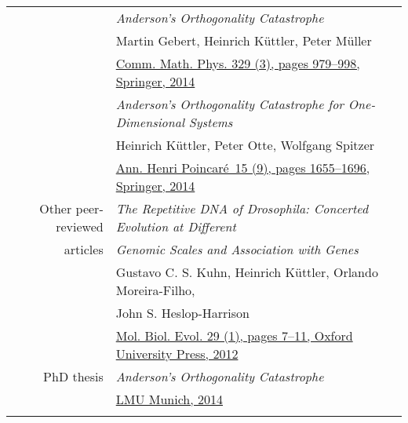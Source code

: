 \documentclass[11pt,english,a4paper]{memoir}
\makeatletter
\newcommand{\muelleratlmudotde}{mue\rlap{\textcolor{white}{hugo@egon}}ll\rlap{\textcolor{white}{@symmetry is overrated}}er@\rlap{\textcolor{white}{yesihatespamspamspam}}l\rlap{\textcolor{white}{spam@spam@spam!}}mu\rlap{\textcolor{white}{.com}}.de}
\newcommand{\juergenvoigtattudresdende}{juer\rlap{\textcolor{white}{hugo@egon}}gen.voi\rlap{\textcolor{white}{@symmetry is overrated}}gt@\rlap{\textcolor{white}{yesihatespamspamspam}}tu-\rlap{\textcolor{white}{spam@spam@spam!}}dres\rlap{\textcolor{white}{.com}}den.de}
\newcommand{\red}{\color{Maroon}}
\newcommand{\header}[1]{%
  \addlinespace[2ex]
  & \large{\red\textsc{\MakeLowercase{#1}}} \tabularnewline
  \midrule}
\newcommand{\n}{\tabularnewline}
\makeatother
\begin{document}
\begin{center}
\begin{tabular}{rl}
  & \textit{Anderson's Orthogonality Catastrophe} \\
  & Martin Gebert, Heinrich Küttler, Peter Müller \\
  & \href{http://dx.doi.org/10.1007/s00220-014-1914-3}{Comm. Math. Phys. 329 (3), pages 979--998,
  Springer, 2014} \n \addlinespace

  & \textit{Anderson's Orthogonality Catastrophe for One-Dimensional Systems}
  \\
  & Heinrich Küttler, Peter Otte, Wolfgang Spitzer \\
  & \href{http://dx.doi.org/10.1007/s00023-013-0287-z}{Ann. Henri Poincaré \,15 (9), pages 1655--1696, Springer, 2014}

  \n \addlinespace
  Other peer-reviewed & \textit{The Repetitive DNA of Drosophila:
  Concerted Evolution at Different}
  \\
  articles & \textit{Genomic Scales and Association with Genes} \\
  & Gustavo C. S. Kuhn, Heinrich Küttler, Orlando Moreira-Filho, \\
  & John S. Heslop-Harrison \\
  & \href{http://dx.doi.org/10.1093/molbev/msr173}{Mol. Biol. Evol. 29 (1), pages 7--11, Oxford University Press, 2012}
  \n \addlinespace

  PhD thesis & \textit{Anderson's Orthogonality Catastrophe} \\
  & \href{http://edoc.ub.uni-muenchen.de/17442/}{LMU Munich, 2014} \n \addlinespace



\end{tabular}

\end{center}


\end{document}
